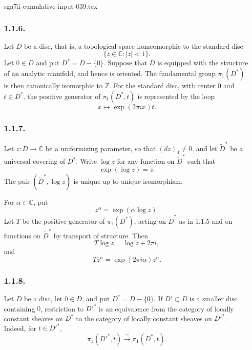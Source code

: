 \begin{filecontents*}{sga7ii-cumulative-input-039.tex}
\subsubsection*{1.1.6.}
Let $D$ be a disc, that is, a topological space homeomorphic to the
standard disc
\[
\{z\in\mathbb C:|z|<1\}.
\]
Let $0\in D$ and put $D^*=D-\{0\}$.  Suppose that $D$ is equipped
with the structure of an analytic manifold, and hence is oriented.
The fundamental group $\pi_1(D^*)$ is then canonically isomorphic to
$\mathbb Z$.  For the standard disc, with center $0$ and
$t\in D^*$, the positive generator of $\pi_1(D^*,t)$ is represented
by the loop
\[
x\longmapsto \exp(2\pi i x)t.
\]

\subsubsection*{1.1.7.}
Let $z:D\longrightarrow\mathbb C$ be a uniformizing parameter, so
that $(dz)_0\ne0$, and let $\widetilde D^*$ be a universal covering
of $D^*$.  Write $\log z$ for any function on $\widetilde D^*$ such
that
\[
\exp(\log z)=z.
\]
The pair $(\widetilde D^*,\log z)$ is unique up to unique
isomorphism.

For $\alpha\in\mathbb C$, put
\[
z^\alpha=\exp(\alpha\log z).
\]
Let $T$ be the positive generator of $\pi_1(D^*)$, acting on
$\widetilde D^*$ as in 1.1.5 and on functions on
$\widetilde D^*$ by transport of structure.  Then
\begin{equation}\tag{1.1.7.1}
T\log z=\log z+2\pi i,
\end{equation}
and
\begin{equation}\tag{1.1.7.2}
Tz^\alpha=\exp(2\pi i\alpha)z^\alpha.
\end{equation}

\subsubsection*{1.1.8.}
Let $D$ be a disc, let $0\in D$, and put $D^*=D-\{0\}$.  If
$D'\subset D$ is a smaller disc containing $0$, restriction to
$D'^{*}$ is an equivalence from the category of locally constant
sheaves on $D^*$ to the category of locally constant sheaves on
$D'^{*}$.  Indeed, for $t\in D'^{*}$,
\[
\pi_1(D'^{*},t)\xrightarrow{\ \sim\ }\pi_1(D^*,t).
\]


\end{filecontents*}
